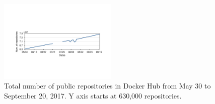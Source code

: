 \begin{figure}
  \centering
  \includegraphics[width=0.5\textwidth]{graphs/image_growth.pdf}
  \caption{Total number of public repositories in Docker Hub
	   from May 30 to September 20, 2017. Y axis starts
	   at 630,000 repositories.
	  }
  \label{fig_image_growth}
\end{figure}



